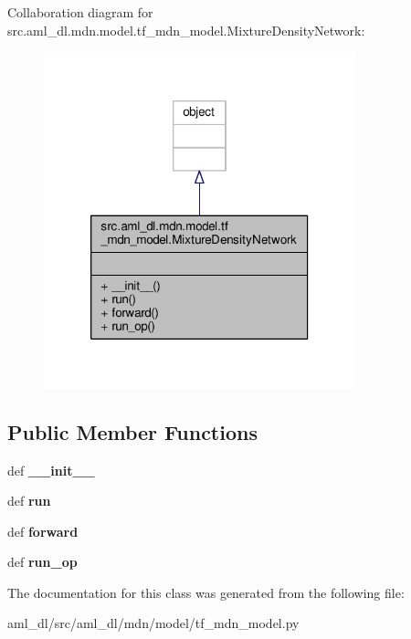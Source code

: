 Collaboration diagram for src.\-aml\-\_\-dl.\-mdn.\-model.\-tf\-\_\-mdn\-\_\-model.\-Mixture\-Density\-Network\-:\nopagebreak
\begin{figure}[H]
\begin{center}
\leavevmode
\includegraphics[width=256pt]{classsrc_1_1aml__dl_1_1mdn_1_1model_1_1tf__mdn__model_1_1_mixture_density_network__coll__graph}
\end{center}
\end{figure}
\subsection*{Public Member Functions}
\begin{DoxyCompactItemize}
\item 
\hypertarget{classsrc_1_1aml__dl_1_1mdn_1_1model_1_1tf__mdn__model_1_1_mixture_density_network_a78f4413ba6b4ae4f2f9831ba57871fb8}{def {\bfseries \-\_\-\-\_\-init\-\_\-\-\_\-}}\label{classsrc_1_1aml__dl_1_1mdn_1_1model_1_1tf__mdn__model_1_1_mixture_density_network_a78f4413ba6b4ae4f2f9831ba57871fb8}

\item 
\hypertarget{classsrc_1_1aml__dl_1_1mdn_1_1model_1_1tf__mdn__model_1_1_mixture_density_network_a19614da0482bce85ea8a0996b9d71c7f}{def {\bfseries run}}\label{classsrc_1_1aml__dl_1_1mdn_1_1model_1_1tf__mdn__model_1_1_mixture_density_network_a19614da0482bce85ea8a0996b9d71c7f}

\item 
\hypertarget{classsrc_1_1aml__dl_1_1mdn_1_1model_1_1tf__mdn__model_1_1_mixture_density_network_a7691ed5a080aee0cb33b8438fb95648d}{def {\bfseries forward}}\label{classsrc_1_1aml__dl_1_1mdn_1_1model_1_1tf__mdn__model_1_1_mixture_density_network_a7691ed5a080aee0cb33b8438fb95648d}

\item 
\hypertarget{classsrc_1_1aml__dl_1_1mdn_1_1model_1_1tf__mdn__model_1_1_mixture_density_network_a893b1268d75cbe5afbc2ede49499034e}{def {\bfseries run\-\_\-op}}\label{classsrc_1_1aml__dl_1_1mdn_1_1model_1_1tf__mdn__model_1_1_mixture_density_network_a893b1268d75cbe5afbc2ede49499034e}

\end{DoxyCompactItemize}


The documentation for this class was generated from the following file\-:\begin{DoxyCompactItemize}
\item 
aml\-\_\-dl/src/aml\-\_\-dl/mdn/model/tf\-\_\-mdn\-\_\-model.\-py\end{DoxyCompactItemize}
